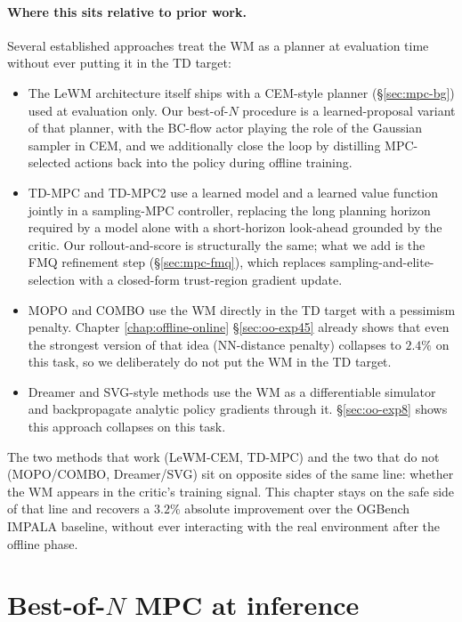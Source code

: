 \paragraph{Where this sits relative to prior work.} Several established approaches treat the WM as a planner at evaluation time without ever putting it in the TD target:
\begin{itemize}
    \item The LeWM architecture itself \cite{maes2026leworldmodelstableendtoendjointembedding} ships with a CEM-style planner (\S\ref{sec:mpc-bg}) used at evaluation only. Our best-of-$N$ procedure is a learned-proposal variant of that planner, with the BC-flow actor playing the role of the Gaussian sampler in CEM, and we additionally close the loop by distilling MPC-selected actions back into the policy during offline training.
    \item TD-MPC \cite{hansen2022tdmpc} and TD-MPC2 \cite{hansen2024tdmpc2} use a learned model and a learned value function jointly in a sampling-MPC controller, replacing the long planning horizon required by a model alone with a short-horizon look-ahead grounded by the critic. Our rollout-and-score is structurally the same; what we add is the FMQ refinement step (\S\ref{sec:mpc-fmq}), which replaces sampling-and-elite-selection with a closed-form trust-region gradient update.
    \item MOPO \cite{yu2020mopomodelbasedofflinepolicy} and COMBO \cite{yu2021combo} use the WM directly in the TD target with a pessimism penalty. Chapter \ref{chap:offline-online} \S\ref{sec:oo-exp45} already shows that even the strongest version of that idea (NN-distance penalty) collapses to $2.4\%$ on this task, so we deliberately do not put the WM in the TD target.
    \item Dreamer and SVG-style methods \cite{hafner2020dreamer, heess2015svg} use the WM as a differentiable simulator and backpropagate analytic policy gradients through it. \S\ref{sec:oo-exp8} shows this approach collapses on this task.
\end{itemize}
The two methods that work (LeWM-CEM, TD-MPC) and the two that do not (MOPO/COMBO, Dreamer/SVG) sit on opposite sides of the same line: whether the WM appears in the critic's training signal. This chapter stays on the safe side of that line and recovers a $3.2\%$ absolute improvement over the OGBench IMPALA baseline, without ever interacting with the real environment after the offline phase.

\section{Best-of-$N$ MPC at inference}
\label{sec:mpc-bon}

